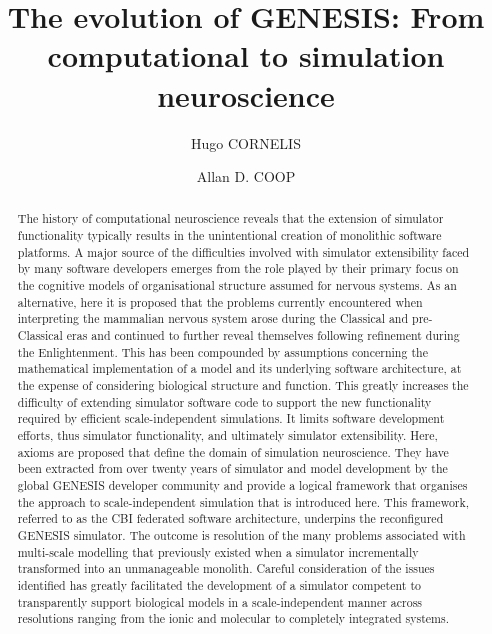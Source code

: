 \documentclass[11pt,3p,twocolumn]{JMN}
\begin{document}
\pagestyle{fancy}
\fancyhf{}
\rfoot{\thepage}

\begin{frontmatter}

\title{The evolution of GENESIS: From computational to simulation neuroscience}

\author[a,1]{Hugo CORNELIS} 
\author[b]{Allan D. COOP} 

\address[a]{\noindent Neurospaces Development, Daniëlstraat 27, 3500 Hasselt, BELGIUM}

\address[b]{Three Way Street, PO Box 140, Grenfell, 2801 NSW, AUSTRALIA\vspace{0.5cm}}

\address[1]{Corresponding author: {\bf hugo.cornelis@google.com}}

\begin{abstract}
The history of computational neuroscience reveals that the extension of simulator functionality typically results in the unintentional creation of monolithic software platforms.  A major source of the difficulties involved with simulator extensibility faced by many software developers emerges from the role played by their primary focus on the cognitive models of organisational structure assumed for nervous systems. As an alternative, here it is proposed that the problems currently encountered when interpreting the mammalian nervous system arose during the Classical and pre-Classical eras and continued to further reveal themselves following refinement during the Enlightenment. This has been compounded by assumptions concerning the mathematical implementation of a model and its underlying software architecture, at the expense of considering biological structure and function. This greatly increases the difficulty of extending simulator software code to support the new functionality required by efficient scale-independent simulations.  It limits software development efforts, thus simulator functionality, and ultimately simulator extensibility. Here, axioms are proposed that define the domain of simulation neuroscience. They have been extracted from over twenty years of simulator and model development by the global GENESIS developer community and provide a logical framework that organises the approach to scale-independent simulation that is introduced here. This framework, referred to as the CBI federated software architecture, underpins the reconfigured GENESIS simulator.  The outcome is resolution of the many problems associated with multi-scale modelling that previously existed when a simulator incrementally transformed into an unmanageable monolith. Careful consideration of the issues identified has greatly facilitated the development of a simulator competent to transparently support biological models in a scale-independent manner across resolutions ranging from the ionic and molecular to completely integrated systems.
\end{abstract}


\end{frontmatter}
\end{document}
